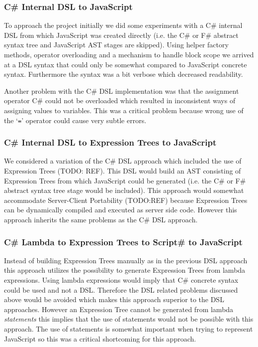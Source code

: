 		\subsubsection{C\# Internal DSL to JavaScript} %
		\label{ssub:c_internal_dsl_to_javascript}
			To approach the project initially we did some experiments with a C\# internal DSL from which JavaScript was created directly (i.e. the C\# or F\# abstract syntax tree and JavaScript AST stages are skipped). Using helper factory methods, operator overloading and a mechanism to handle block scope we arrived at a DSL syntax that could only be somewhat compared to JavaScript concrete syntax. Furthermore the syntax was a bit verbose which decreased readability. 

			Another problem with the C\# DSL implementation was that the assignment operator C\# could not be overloaded which resulted in inconsistent ways of assigning values to variables. This was a critical problem because wrong use of the ‘\texttt{=}’ operator could cause very subtle errors.


		\subsubsection{C\# Internal DSL to Expression Trees to JavaScript} %
		\label{ssub:c_internal_dsl_to_expression_trees_to_javascript}

			We considered a variation of the C\# DSL approach which included the use of Expression Trees (TODO: REF). This DSL would build an AST consisting of Expression Trees from which JavaScript could be generated (i.e. the C\# or F\# abstract syntax tree stage would be included). This approach would somewhat accommodate Server-Client Portability (TODO:REF) because Expression Trees can be dynamically compiled and executed as server side code. However this approach inherits the same problems as the C\# DSL approach.

		\subsubsection{C\# Lambda to Expression Trees to Script\# to JavaScript} %
		\label{ssub:c_lambda_to_expression_trees_to_script_to_javascript}
			Instead of building Expression Trees manually as in the previous DSL approach this approach utilizes the possibility to generate Expression Trees from lambda expressions. Using lambda expressions would imply that C\# concrete syntax could be used and not a DSL. Therefore the DSL related problems discussed above would be avoided which makes this approach superior to the DSL approaches. However an Expression Tree cannot be generated from lambda \emph{statements} this implies that the use of statements would not be possible with this approach. The use of statements is somewhat important when trying to represent JavaScript so this was a critical shortcoming for this approach.

